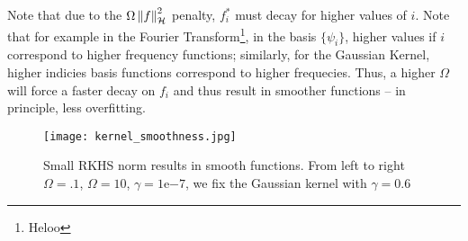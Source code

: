 Note that due to the $\Omega \left\lVert f\right\rVert_{\mathcal{H}}^{2}$ penalty, $f^{*}_i$ must decay for higher values of $i$. Note that
for example in the Fourier Transform\footnote{Heloo}, in the basis $\{\psi_i\}$, higher values if $i$ correspond to higher 
frequency functions; similarly, for the Gaussian Kernel, higher indicies basis functions correspond to 
higher frequecies. Thus, a higher $\Omega$ will force a faster decay on $f_i$ and thus result in smoother functions
-- in principle, less overfitting. 

\begin{figure}[H]
    \texttt{[image: kernel\_smoothness.jpg]}
    \caption{Small RKHS norm results in smooth functions. 
    From left to right $\Omega = .1$, $\Omega = 10$, $\gamma = 1\mathrm{e}{-7}$, 
    we fix the Gaussian kernel with $\gamma = 0.6$}
    \label{fig:kernel_smoothness} 
\end{figure}

    


